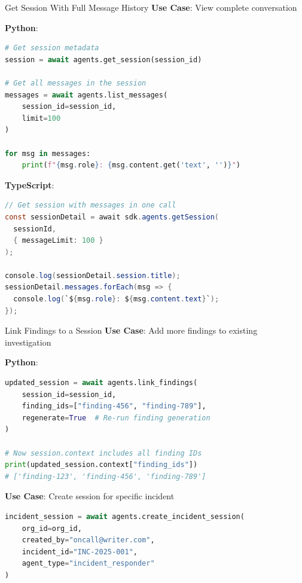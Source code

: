 \documentclass[aspectratio=169]{beamer}
\begin{document}
\begin{frame}[fragile]{Get Session With Full Message History}
\textbf{Use Case}: View complete conversation

\textbf{Python}:
\begin{lstlisting}[language=Python]
# Get session metadata
session = await agents.get_session(session_id)

# Get all messages in the session
messages = await agents.list_messages(
    session_id=session_id,
    limit=100
)

for msg in messages:
    print(f"{msg.role}: {msg.content.get('text', '')}")
\end{lstlisting}

\textbf{TypeScript}:
\begin{lstlisting}[language=Java]
// Get session with messages in one call
const sessionDetail = await sdk.agents.getSession(
  sessionId, 
  { messageLimit: 100 }
);

console.log(sessionDetail.session.title);
sessionDetail.messages.forEach(msg => {
  console.log(`${msg.role}: ${msg.content.text}`);
});
\end{lstlisting}
\end{frame}

\begin{frame}[fragile]{Link Findings to a Session}
\textbf{Use Case}: Add more findings to existing investigation

\textbf{Python}:
\begin{lstlisting}[language=Python]
updated_session = await agents.link_findings(
    session_id=session_id,
    finding_ids=["finding-456", "finding-789"],
    regenerate=True  # Re-run finding generation
)

# Now session.context includes all finding IDs
print(updated_session.context["finding_ids"])
# ['finding-123', 'finding-456', 'finding-789']
\end{lstlisting}

\textbf{Use Case}: Create session for specific incident

\begin{lstlisting}[language=Python]
incident_session = await agents.create_incident_session(
    org_id=org_id,
    created_by="oncall@writer.com",
    incident_id="INC-2025-001",
    agent_type="incident_responder"
)
\end{lstlisting}
\end{frame}
\end{document}
